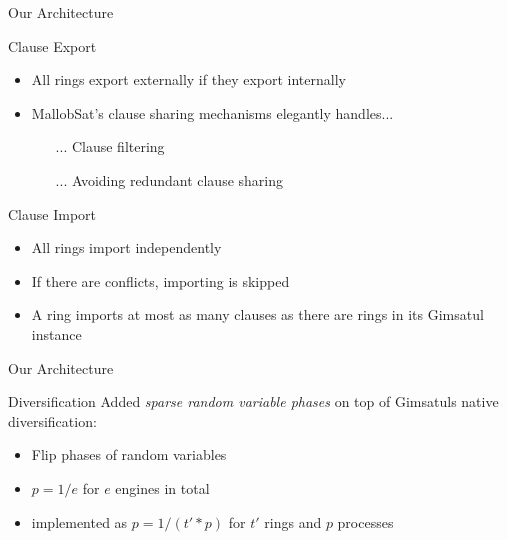 \documentclass[]{sdqbeamer}
\begin{document}
\begin{frame}{Our Architecture}
    \begin{block}{Clause Export}
        \begin{itemize}
            \item All rings export externally if they export internally
            \item MallobSat's clause sharing mechanisms elegantly handles...
            \begin{itemize}
                \item[...] Clause filtering
                \item[...] Avoiding redundant clause sharing
            \end{itemize}
        \end{itemize}
    \end{block}

    \begin{block}{Clause Import}
        \begin{itemize}
            \item All rings import independently
            \item If there are conflicts, importing is skipped
            \item A ring imports at most as many clauses as there are rings in its Gimsatul instance
        \end{itemize}
    \end{block}
\end{frame}

\begin{frame}{Our Architecture}
    \begin{block}{Diversification}
        Added \textit{sparse random variable phases} on top of Gimsatuls native diversification:
        \begin{itemize}
            \item Flip phases of random variables
            \item $p = 1 / e$ for $e$ engines in total
            \item implemented as $p = 1 / (t' * p)$ for $t'$ rings and $p$ processes
        \end{itemize}
    \end{block}
\end{frame}
\end{document}
